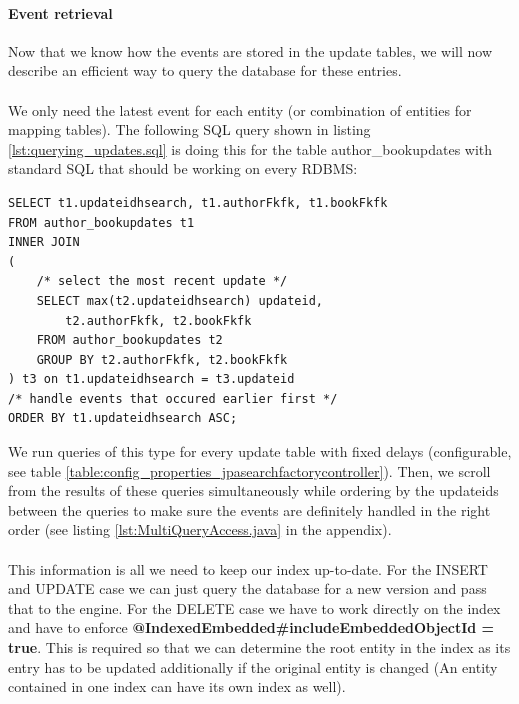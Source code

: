 \pagebreak

\paragraph{Event retrieval}
Now that we know how the events are stored in the update tables, we will now describe an efficient way to query the database for these entries.
\\\\
We only need the latest event for each entity (or combination of entities for mapping tables). The following SQL query shown in listing \ref{lst:querying_updates.sql} is doing this for the table author\_bookupdates with standard SQL that should be working on every RDBMS:
\\
\lstset{language=sql}
\begin{lstlisting}[frame=htrbl, caption={Querying for updates (Author\_Book)},
label={lst:querying_updates.sql}]
SELECT t1.updateidhsearch, t1.authorFkfk, t1.bookFkfk
FROM author_bookupdates t1
INNER JOIN
(
	/* select the most recent update */
	SELECT max(t2.updateidhsearch) updateid, 
		t2.authorFkfk, t2.bookFkfk
	FROM author_bookupdates t2
	GROUP BY t2.authorFkfk, t2.bookFkfk
) t3 on t1.updateidhsearch = t3.updateid
/* handle events that occured earlier first */
ORDER BY t1.updateidhsearch ASC;
\end{lstlisting}
\noindent
We run queries of this type for every update table with fixed delays (configurable, see table \ref{table:config_properties_jpasearchfactorycontroller}). Then, we scroll from the results
of these queries simultaneously while ordering by the updateids between the queries to make sure the events are definitely handled in the right order (see listing \ref{lst:MultiQueryAccess.java} in the appendix).
\\\\
This information is all we need to keep our index up-to-date. For the INSERT and UPDATE case we can just query the database for a new version and pass that to the engine. For the DELETE case we have to work directly on the index and have to enforce  \textbf{@IndexedEmbedded\#includeEmbeddedObjectId = true}. This is required so that we can determine the root entity in the index as its entry has to be updated additionally if the original entity is changed (An entity contained in one index can have its own index as well).

